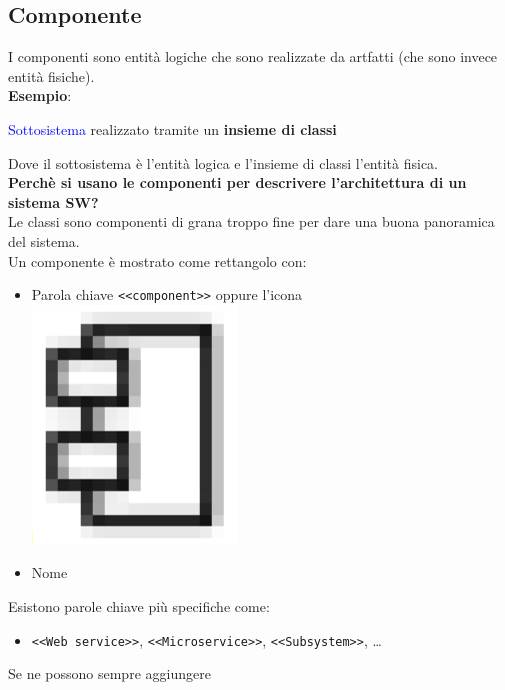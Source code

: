 \documentclass[12pt, a4paper]{report}
\begin{document}
\subsection{Componente}
I componenti sono entità logiche che sono realizzate da artfatti (che sono invece entità fisiche).\\
\textbf{Esempio}:
\begin{center}
    \textcolor{blue}{Sottosistema} realizzato tramite un \textbf{insieme di classi}
\end{center}
Dove il sottosistema è l'entità logica e l'insieme di classi l'entità fisica.\\
\textbf{Perchè si usano le componenti per descrivere l'architettura di un sistema SW?}\\
    Le classi sono componenti di grana troppo fine per dare una buona panoramica del sistema.\\
Un componente è mostrato come rettangolo con:
\begin{itemize}
    \item Parola chiave \texttt{<<component>>} oppure l'icona \includegraphics[height=2\fontcharht\font`\B]{Immagini/componentUML.png}
    \item Nome
\end{itemize}
Esistono parole chiave più specifiche come:
\begin{itemize}
    \item \texttt{<<Web service>>}, \texttt{<<Microservice>>}, \texttt{<<Subsystem>>}, \dots
\end{itemize}
Se ne possono sempre aggiungere
\end{document}
